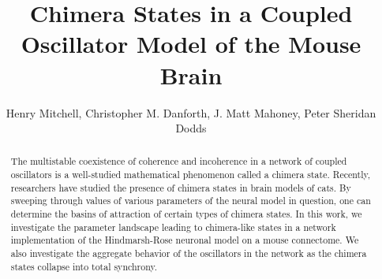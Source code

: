 \documentclass[11pt]{article}
\title{Chimera States in a Coupled Oscillator Model of the Mouse Brain}
\author{Henry Mitchell, Christopher M. Danforth, J. Matt Mahoney, Peter Sheridan Dodds}
\begin{document}
\maketitle

\begin{abstract}
The multistable coexistence of coherence and incoherence in a network of coupled oscillators is a well-studied mathematical phenomenon called a chimera state.
Recently, researchers have studied the presence of chimera states in brain models of cats.
By sweeping through values of various parameters of the neural model in question, one can determine the basins of attraction of certain types of chimera states.
In this work, we investigate the parameter landscape leading to chimera-like states in a network implementation of the Hindmarsh-Rose neuronal model on a mouse connectome.
We also investigate the aggregate behavior of the oscillators in the network as the chimera states collapse into total synchrony.
\end{abstract}
\end{document}
